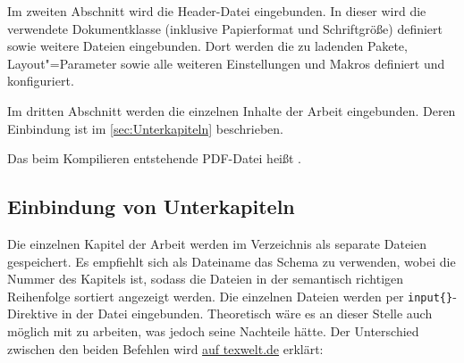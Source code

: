 Im zweiten Abschnitt wird die Header-Datei eingebunden.
In dieser wird die verwendete Dokumentklasse (inklusive Papierformat und Schriftgröße) definiert sowie weitere Dateien eingebunden.
Dort werden die zu ladenden Pakete, Layout"=Parameter sowie alle weiteren Einstellungen und Makros definiert und konfiguriert.

Im dritten Abschnitt werden die einzelnen Inhalte der Arbeit eingebunden.
Deren Einbindung ist im \cref{sec:Unterkapiteln} beschrieben.

Das beim Kompilieren entstehende PDF-Datei heißt .

\subsection[Einbindung von Unterkapiteln]{Einbindung von Unterkapiteln}%
%
\label{sec:Unterkapiteln}
%
Die einzelnen Kapitel der Arbeit werden im Verzeichnis  als separate Dateien gespeichert.
Es empfiehlt sich als Dateiname das Schema  zu verwenden, wobei  die Nummer des Kapitels ist,
sodass die Dateien in der semantisch richtigen Reihenfolge sortiert angezeigt werden.
Die einzelnen Dateien werden per \verb+input{}+-Direktive in der Datei  eingebunden.
Theoretisch wäre es an dieser Stelle auch möglich mit \verb++ zu arbeiten, was jedoch seine Nachteile hätte.
Der Unterschied zwischen den beiden Befehlen wird \href{https://texwelt.de/wissen/fragen/32/was-ist-der-unterschied-zwischen-include-and-input}{auf texwelt.de} erklärt:

